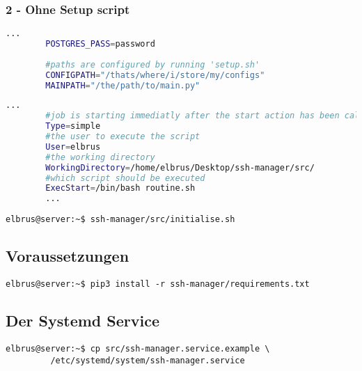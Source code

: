 \documentclass{article}
\begin{document}
	\newpage
	\subsubsection{2 - Ohne Setup script}
	\lstset{style=files}
	\begin{lstlisting}[caption={.env - Die Variable 'CONFIGPATH' sowie die Variable 'MAINPATH' anpassen.}, language=bash, keywords={CONFIGPATH, MAINPATH}, keywordstyle=\color{red}, firstnumber=17]
		...
		POSTGRES_PASS=password
		
		#paths are configured by running 'setup.sh'
		CONFIGPATH="/thats/where/i/store/my/configs"
		MAINPATH="/the/path/to/main.py"
	\end{lstlisting}

	\begin{lstlisting}[caption={ssh-manager.service.example - Die Variable 'WorkingDirectory' sowie die Variable 'User' anpassen.},language=bash ,keywords={WorkingDirectory, User}, keywordstyle=\color{red}, firstnumber=5]
		...
		#job is starting immediatly after the start action has been called
		Type=simple
		#the user to execute the script
		User=elbrus
		#the working directory
		WorkingDirectory=/home/elbrus/Desktop/ssh-manager/src/
		#which script should be executed
		ExecStart=/bin/bash routine.sh
		...
	\end{lstlisting}

	\lstset{style=commands}	
	\begin{lstlisting}[caption={Ausführen des Scripts zur Initialisierung des VCS Verzeichnisses.}]
		elbrus@server:~$ ssh-manager/src/initialise.sh
	\end{lstlisting}

	\subsection[dependencies]{Voraussetzungen}
	\begin{lstlisting}[caption={Installieren von fehlenden python3 Packages.}]
		elbrus@server:~$ pip3 install -r ssh-manager/requirements.txt
	\end{lstlisting}

	\newpage
	\subsection[systemd service]{Der Systemd Service}
	\begin{lstlisting}[caption={Kopieren des Serviceprogrammes}]
		elbrus@server:~$ cp src/ssh-manager.service.example \
		 /etc/systemd/system/ssh-manager.service
	\end{lstlisting}
\end{document}
